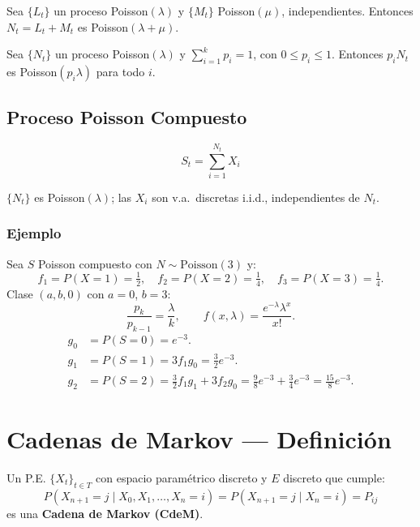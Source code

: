 \begin{teo}{}{}
Sea $\{L_t\}$ un proceso Poisson$(\lambda)$ y $\{M_t\}$ Poisson$(\mu)$, independientes. Entonces $N_t=L_t+M_t$ es Poisson$(\lambda+\mu)$.
\end{teo}

\begin{teo}{}{}
Sea $\{N_t\}$ un proceso Poisson$(\lambda)$ y $\sum_{i=1}^{k}p_i=1$, con $0\leq p_i\leq 1$. Entonces $p_iN_t$ es Poisson$(p_i\lambda)$ para todo $i$.
\end{teo}

\subsection{Proceso Poisson Compuesto}

\[S_t=\sum_{i=1}^{N_t}X_i\]

$\{N_t\}$ es Poisson$(\lambda)$; las $X_i$ son v.a.\ discretas i.i.d., independientes de $N_t$.

\subsubsection*{Ejemplo}

Sea $S$ Poisson compuesto con $N\sim\mathrm{Poisson}(3)$ y:
\[
f_1=P(X=1)=\tfrac{1}{2},\quad f_2=P(X=2)=\tfrac{1}{4},\quad f_3=P(X=3)=\tfrac{1}{4}.
\]
Clase $(a,b,0)$ con $a=0$, $b=3$:
\[
\frac{p_k}{p_{k-1}}=\frac{\lambda}{k},\qquad f(x,\lambda)=\frac{e^{-\lambda}\lambda^x}{x!}.
\]
\begin{align*}
g_0&=P(S=0)=e^{-3}.\\
g_1&=P(S=1)=3f_1g_0=\tfrac{3}{2}e^{-3}.\\
g_2&=P(S=2)=\tfrac{3}{2}f_1g_1+3f_2g_0=\tfrac{9}{8}e^{-3}+\tfrac{3}{4}e^{-3}=\tfrac{15}{8}e^{-3}.
\end{align*}

\section{Cadenas de Markov --- Definición}

\begin{defi}{}{}
Un P.E. $\{X_t\}_{t\in T}$ con espacio paramétrico discreto y $E$ discreto que cumple:
\[
P(X_{n+1}=j\mid X_0,X_1,\dots,X_n=i)=P(X_{n+1}=j\mid X_n=i)=P_{ij}
\]
es una \textbf{Cadena de Markov (CdeM)}.
\end{defi}

